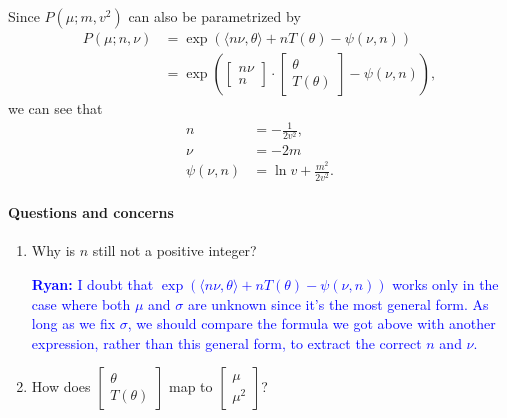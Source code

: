 \documentclass[12pt]{article}
\begin{document}
Since $P(\mu;m,v^2)$ can also be parametrized by
\begin{align*}
  P(\mu;n,\nu) & =\exp\left( \langle n\nu,\theta\rangle+nT(\theta)-\psi(\nu,n) \right)                      \\
               & =\exp\left( \begin{bmatrix}
    n\nu \\n
  \end{bmatrix}\cdot\begin{bmatrix}
    \theta \\T(\theta)
  \end{bmatrix}-\psi(\nu,n) \right),
\end{align*} we can see that
\begin{align*}
  n           & =-\frac{1}{2v^2},        \\
  \nu         & =-2m                     \\
  \psi(\nu,n) & =\ln v+\frac{m^2}{2v^2}.
\end{align*}

\paragraph{Questions and concerns}
\begin{enumerate}
  \item Why is $n$ still not a positive integer?
  
  \textcolor{blue}{\textbf{Ryan:} I doubt that $\exp\left( \langle n\nu,\theta\rangle+nT(\theta)-\psi(\nu,n) \right)$ works only in the case where both $\mu$ and $\sigma$ are unknown since it's the most general form. As long as we fix $\sigma$, we should compare the formula we got above with another expression, rather than this general form, to extract the correct $n$ and $\nu$.}

  \item How does $\begin{bmatrix}
            \theta \\T(\theta)
          \end{bmatrix}$ map to $\begin{bmatrix}
            \mu \\\mu^2
          \end{bmatrix}$?
\end{enumerate}
\end{document}
